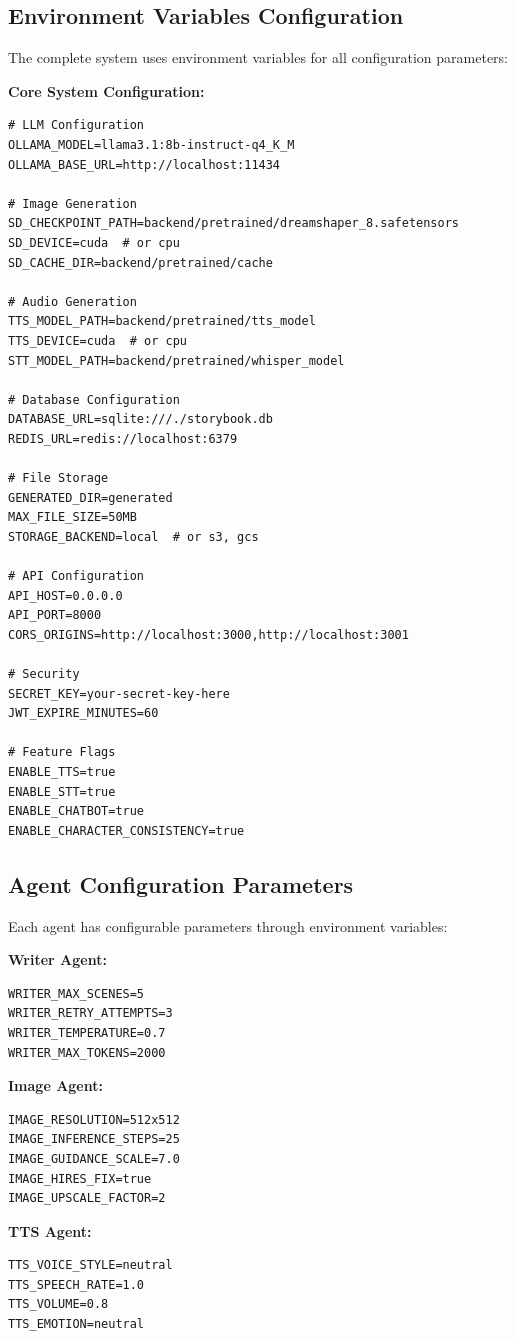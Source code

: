{\subsection{Environment Variables Configuration}
The complete system uses environment variables for all configuration parameters:

\textbf{Core System Configuration:}
\begin{verbatim}
# LLM Configuration
OLLAMA_MODEL=llama3.1:8b-instruct-q4_K_M
OLLAMA_BASE_URL=http://localhost:11434

# Image Generation
SD_CHECKPOINT_PATH=backend/pretrained/dreamshaper_8.safetensors
SD_DEVICE=cuda  # or cpu
SD_CACHE_DIR=backend/pretrained/cache

# Audio Generation
TTS_MODEL_PATH=backend/pretrained/tts_model
TTS_DEVICE=cuda  # or cpu
STT_MODEL_PATH=backend/pretrained/whisper_model

# Database Configuration
DATABASE_URL=sqlite:///./storybook.db
REDIS_URL=redis://localhost:6379

# File Storage
GENERATED_DIR=generated
MAX_FILE_SIZE=50MB
STORAGE_BACKEND=local  # or s3, gcs

# API Configuration
API_HOST=0.0.0.0
API_PORT=8000
CORS_ORIGINS=http://localhost:3000,http://localhost:3001

# Security
SECRET_KEY=your-secret-key-here
JWT_EXPIRE_MINUTES=60

# Feature Flags
ENABLE_TTS=true
ENABLE_STT=true
ENABLE_CHATBOT=true
ENABLE_CHARACTER_CONSISTENCY=true
\end{verbatim}

\subsection{Agent Configuration Parameters}
Each agent has configurable parameters through environment variables:

\textbf{Writer Agent:}
\begin{verbatim}
WRITER_MAX_SCENES=5
WRITER_RETRY_ATTEMPTS=3
WRITER_TEMPERATURE=0.7
WRITER_MAX_TOKENS=2000
\end{verbatim}

\textbf{Image Agent:}
\begin{verbatim}
IMAGE_RESOLUTION=512x512
IMAGE_INFERENCE_STEPS=25
IMAGE_GUIDANCE_SCALE=7.0
IMAGE_HIRES_FIX=true
IMAGE_UPSCALE_FACTOR=2
\end{verbatim}

\textbf{TTS Agent:}
\begin{verbatim}
TTS_VOICE_STYLE=neutral
TTS_SPEECH_RATE=1.0
TTS_VOLUME=0.8
TTS_EMOTION=neutral
\end{verbatim}

}
